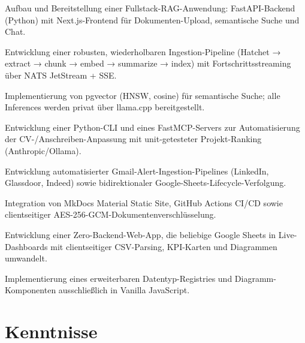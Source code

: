 \documentclass[10pt,a4paper]{resume}
\begin{document}
\bullets
  \item Aufbau und Bereitstellung einer Fullstack-RAG-Anwendung: FastAPI-Backend (Python) mit Next.js-Frontend für Dokumenten-Upload, semantische Suche und Chat.
  \item Entwicklung einer robusten, wiederholbaren Ingestion-Pipeline (Hatchet → extract → chunk → embed → summarize → index) mit Fortschrittsstreaming über NATS JetStream + SSE.
  \item Implementierung von pgvector (HNSW, cosine) für semantische Suche; alle Inferences werden privat über llama.cpp bereitgestellt.
\bulletsend
\vspace{1.0pt}
\bullets
  \item Entwicklung einer Python-CLI und eines FastMCP-Servers zur Automatisierung der CV-/Anschreiben-Anpassung mit unit-getesteter Projekt-Ranking (Anthropic/Ollama).
  \item Entwicklung automatisierter Gmail-Alert-Ingestion-Pipelines (LinkedIn, Glassdoor, Indeed) sowie bidirektionaler Google-Sheets-Lifecycle-Verfolgung.
  \item Integration von MkDocs Material Static Site, GitHub Actions CI/CD sowie clientseitiger AES-256-GCM-Dokumentenverschlüsselung.
\bulletsend
\vspace{1.0pt}
\bullets
  \item Entwicklung einer Zero-Backend-Web-App, die beliebige Google Sheets in Live-Dashboards mit clientseitiger CSV-Parsing, KPI-Karten und Diagrammen umwandelt.
  \item Implementierung eines erweiterbaren Datentyp-Registries und Diagramm-Komponenten ausschließlich in Vanilla JavaScript.
\bulletsend

\section{Kenntnisse}
\end{document}
